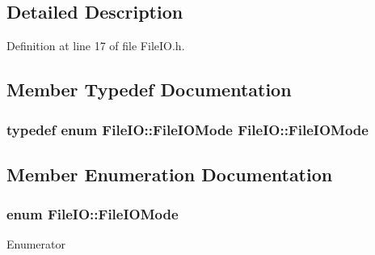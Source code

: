 \subsection{Detailed Description}


Definition at line 17 of file File\+I\+O.\+h.



\subsection{Member Typedef Documentation}
\subsubsection[{\texorpdfstring{File\+I\+O\+Mode}{FileIOMode}}]{\setlength{\rightskip}{0pt plus 5cm}typedef enum {\bf File\+I\+O\+::\+File\+I\+O\+Mode}  {\bf File\+I\+O\+::\+File\+I\+O\+Mode}}\hypertarget{class_file_i_o_af6406e5e99e23837710ec4a68351127b}{}\label{class_file_i_o_af6406e5e99e23837710ec4a68351127b}


\subsection{Member Enumeration Documentation}
\subsubsection[{\texorpdfstring{File\+I\+O\+Mode}{FileIOMode}}]{\setlength{\rightskip}{0pt plus 5cm}enum {\bf File\+I\+O\+::\+File\+I\+O\+Mode}}\hypertarget{class_file_i_o_a1a04aed593866589a39e524191a0d53a}{}\label{class_file_i_o_a1a04aed593866589a39e524191a0d53a}
\begin{Desc}
\item[Enumerator]\par
\begin{description}
\item[{\em 
Input\hypertarget{class_file_i_o_a1a04aed593866589a39e524191a0d53aa28dba616e613bc5f67040d49f8406166}{}\label{class_file_i_o_a1a04aed593866589a39e524191a0d53aa28dba616e613bc5f67040d49f8406166}
}]\item[{\em 
Output\hypertarget{class_file_i_o_a1a04aed593866589a39e524191a0d53aae8c6cc79d9d51b6f8ee219647e315e49}{}\label{class_file_i_o_a1a04aed593866589a39e524191a0d53aae8c6cc79d9d51b6f8ee219647e315e49}
}]\end{description}
\end{Desc}


